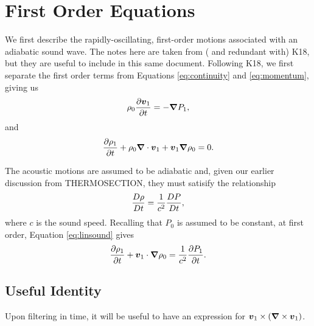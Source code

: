 \section{First Order Equations}
We first describe the rapidly-oscillating, first-order motions associated with an adiabatic sound wave. The notes here are taken from ( and redundant with) K18, but they are useful to include in this same document.  Following K18, we first separate the first order terms from Equations \ref{eq:continuity} and \ref{eq:momentum}, giving us
\begin{equation}
\rho_0\frac{\partial\boldsymbol{v}_1}{\partial t} = -\boldsymbol{\nabla} P_1,
\end{equation}
and
\begin{equation}
\frac{\partial\rho_1}{\partial t} + \rho_0\boldsymbol{\nabla}\cdot\boldsymbol{v}_1 + \boldsymbol{v}_1\boldsymbol{\nabla}\rho_0 = 0.
\end{equation}

The acoustic motions are assumed to be adiabatic and, given our earlier discussion from THERMOSECTION, they must satisify the relationship
\begin{equation}
\label{eq:linsound}
\frac{D\rho}{Dt} = \frac{1}{c^2}\frac{DP}{Dt},
\end{equation}
where $c$ is the sound speed.   Recalling that $P_0$ is assumed to be constant, at first order, Equation \ref{eq:linsound} gives
\begin{equation}
\frac{\partial\rho_1}{\partial t} +\boldsymbol{v}_1\cdot\boldsymbol{\nabla}\rho_0 = \frac{1}{c^2}\frac{\partial P_1}{\partial t}.
\end{equation}

\subsection{Useful Identity}
Upon filtering in time, it will be useful to have an expression for $\boldsymbol{v}_1\times\left(\boldsymbol{\nabla}\times\boldsymbol{v}_1 \right)$.

